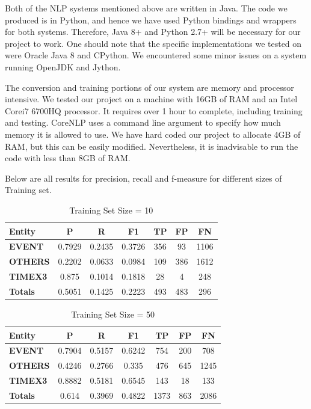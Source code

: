 \documentclass[letterpaper, 10 pt, conference]{ieeeconf}
\begin{document}
Both of the NLP systems mentioned above are written in Java. The code we produced is in Python, and hence we have used Python bindings and wrappers for both systems. Therefore, Java 8+ and Python 2.7+ will be necessary for our project to work. One should note that the specific implementations we tested on were Oracle Java 8 and CPython. We encountered some minor issues on a system running OpenJDK and Jython.

The conversion and training portions of our system are memory and processor intensive. We tested our project on a machine with 16GB of RAM and an Intel Corei7 6700HQ processor. It requires over 1 hour to complete, including training and testing. CoreNLP uses a command line argument to specify how much memory it is allowed to use. We have hard coded our project to allocate 4GB of RAM, but this can be easily modified. Nevertheless, it is inadvisable to run the code with less than 8GB of RAM.

Below are all results for precision, recall and f-measure for different sizes of Training set.

\begin{table}[!htpb]
\centering
\caption{Training Set Size = 10}
\label{t1}
\begin{tabular}{lcccccc}
\textbf{Entity} & \textbf{P} & \textbf{R} & \textbf{F1} & \textbf{TP} & \textbf{FP} & \textbf{FN} \\
\hline
\textbf{EVENT}  & 0.7929     & 0.2435     & 0.3726      & 356         & 93          & 1106        \\
\textbf{OTHERS} & 0.2202     & 0.0633     & 0.0984      & 109         & 386         & 1612        \\
\textbf{TIMEX3} & 0.875      & 0.1014     & 0.1818      & 28          & 4           & 248         \\
\textbf{Totals} & 0.5051     & 0.1425     & 0.2223      & 493         & 483         & 296        
\end{tabular}
\end{table}

\begin{table}[!htpb]
\centering
\caption{Training Set Size = 50}
\label{t2}
\begin{tabular}{lcccccc}
\textbf{Entity} & \textbf{P} & \textbf{R} & \textbf{F1} & \textbf{TP} & \textbf{FP} & \textbf{FN} \\
\hline
\textbf{EVENT}  & 0.7904     & 0.5157     & 0.6242      & 754         & 200         & 708         \\
\textbf{OTHERS} & 0.4246     & 0.2766     & 0.335       & 476         & 645         & 1245        \\
\textbf{TIMEX3} & 0.8882     & 0.5181     & 0.6545      & 143         & 18          & 133         \\
\textbf{Totals} & 0.614      & 0.3969     & 0.4822      & 1373        & 863         & 2086       
\end{tabular}
\end{table}
\end{document}

